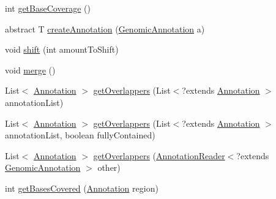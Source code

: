 \begin{DoxyCompactItemize}
\item 
int \hyperlink{classbroad_1_1core_1_1annotation_1_1_annotation_reader_3_01_t_01extends_01_genomic_annotation_01_4_aa231c504abef8d129d8c1066daaa8124}{get\+Base\+Coverage} ()
\item 
abstract T \hyperlink{classbroad_1_1core_1_1annotation_1_1_annotation_reader_3_01_t_01extends_01_genomic_annotation_01_4_af52bebd3414e0f94c87ebd3c8d6fa158}{create\+Annotation} (\hyperlink{interfacebroad_1_1core_1_1annotation_1_1_genomic_annotation}{Genomic\+Annotation} a)
\item 
void \hyperlink{classbroad_1_1core_1_1annotation_1_1_annotation_reader_3_01_t_01extends_01_genomic_annotation_01_4_a905175697ebd6e928f52403bf4a88832}{shift} (int amount\+To\+Shift)
\item 
void \hyperlink{classbroad_1_1core_1_1annotation_1_1_annotation_reader_3_01_t_01extends_01_genomic_annotation_01_4_a166f1db833577d0454a67ece8db9916e}{merge} ()
\item 
List$<$ \hyperlink{interfaceumms_1_1core_1_1annotation_1_1_annotation}{Annotation} $>$ \hyperlink{classbroad_1_1core_1_1annotation_1_1_annotation_reader_3_01_t_01extends_01_genomic_annotation_01_4_a364394692cd3cce7eb4bc247685b9572}{get\+Overlappers} (List$<$?extends \hyperlink{interfaceumms_1_1core_1_1annotation_1_1_annotation}{Annotation} $>$ annotation\+List)
\item 
List$<$ \hyperlink{interfaceumms_1_1core_1_1annotation_1_1_annotation}{Annotation} $>$ \hyperlink{classbroad_1_1core_1_1annotation_1_1_annotation_reader_3_01_t_01extends_01_genomic_annotation_01_4_a9b33a9974717b7dee7687e26279412f8}{get\+Overlappers} (List$<$?extends \hyperlink{interfaceumms_1_1core_1_1annotation_1_1_annotation}{Annotation} $>$ annotation\+List, boolean fully\+Contained)
\item 
List$<$ \hyperlink{interfaceumms_1_1core_1_1annotation_1_1_annotation}{Annotation} $>$ \hyperlink{classbroad_1_1core_1_1annotation_1_1_annotation_reader_3_01_t_01extends_01_genomic_annotation_01_4_a4a693b8faabb2c957bff9c139c604d93}{get\+Overlappers} (\hyperlink{classbroad_1_1core_1_1annotation_1_1_annotation_reader_3_01_t_01extends_01_genomic_annotation_01_4_adc7b77cf9681958941014c7b460dbb9f}{Annotation\+Reader}$<$?extends \hyperlink{interfacebroad_1_1core_1_1annotation_1_1_genomic_annotation}{Genomic\+Annotation} $>$ other)
\item 
int \hyperlink{classbroad_1_1core_1_1annotation_1_1_annotation_reader_3_01_t_01extends_01_genomic_annotation_01_4_a66f9bfe25e08fc0309ac119b99c6464d}{get\+Bases\+Covered} (\hyperlink{interfaceumms_1_1core_1_1annotation_1_1_annotation}{Annotation} region)

\end{DoxyCompactItemize}
